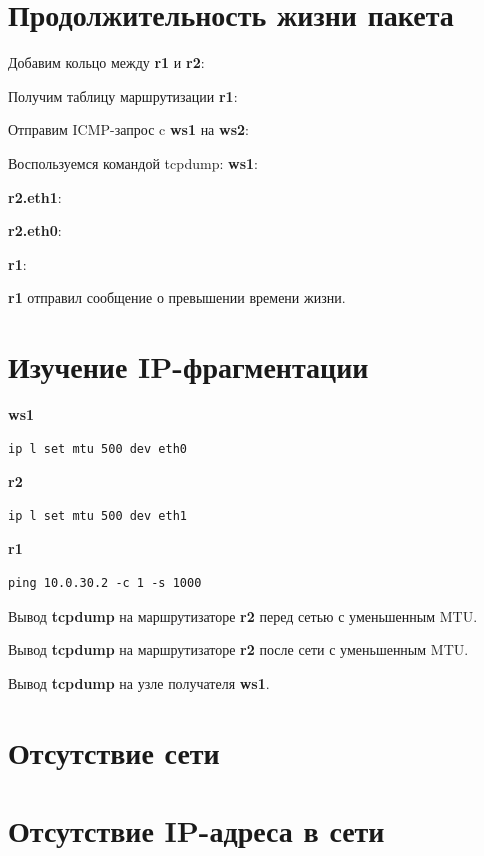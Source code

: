 \documentclass[a4paper,12pt]{article}
\begin{document}
\section{Продолжительность жизни пакета}
Добавим кольцо между \textbf{r1} и \textbf{r2}:


Получим таблицу маршрутизации \textbf{r1}:


Отправим ICMP-запрос c \textbf{ws1} на \textbf{ws2}:


Воспользуемся командой tcpdump:
\textbf{ws1}:

\textbf{r2.eth1}:

\textbf{r2.eth0}:

\textbf{r1}:


\textbf{r1} отправил сообщение о превышении времени жизни.

\section{Изучение IP-фрагментации}
\textbf{ws1}
\begin{lstlisting}
ip l set mtu 500 dev eth0
\end{lstlisting}

\textbf{r2}
\begin{lstlisting}
ip l set mtu 500 dev eth1
\end{lstlisting}

\textbf{r1}
\begin{lstlisting}
ping 10.0.30.2 -c 1 -s 1000
\end{lstlisting}

Вывод \textbf{tcpdump} на маршрутизаторе \textbf{r2} перед сетью с уменьшенным MTU.


Вывод \textbf{tcpdump} на маршрутизаторе \textbf{r2} после сети с уменьшенным MTU.


Вывод \textbf{tcpdump} на узле получателя \textbf{ws1}.



\section{Отсутствие сети}



\section{Отсутствие IP-адреса в сети}

\end{document}
